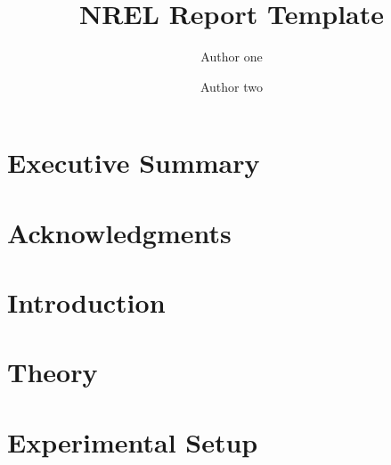\documentclass[]{nrel}
\title{NREL Report Template}
\author{Author one} %
\author{Author two} %
\affil{National Renewable Energy Laboratory}
\begin{document}
\frontmatter
\chapter{Executive Summary}

\chapter{Acknowledgments}


\clearpage
\tableofcontents
\listoffigures
\listoftables

\mainmatter
\pagestyle{fancy}
\chapter{Introduction} %
\label{sec:intro}



\chapter{Theory}
\label{sec:theory}

\chapter{Experimental Setup}
\label{sec:exp}
\end{document}
